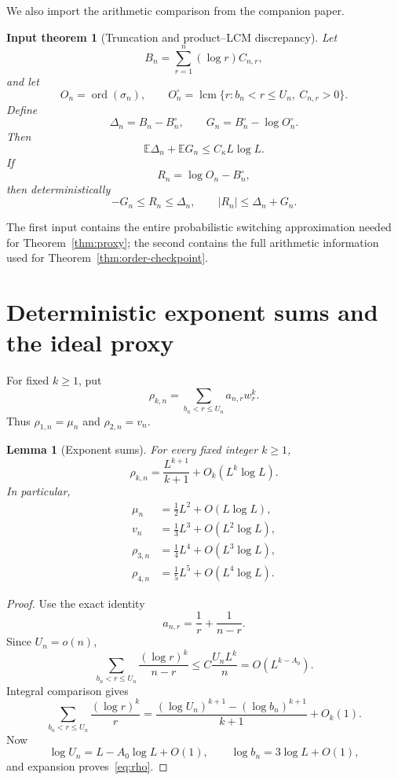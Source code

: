\documentclass[11pt]{article}
\newtheorem{lemma}[theorem]{Lemma}
\newtheorem{inputtheorem}[theorem]{Input theorem}
\theoremstyle{remark}
\newcommand{\Ee}{\mathbb E}
\newcommand{\ord}{\operatorname{ord}}
\newcommand{\lcm}{\operatorname{lcm}}
\begin{document}
We also import the arithmetic comparison from the companion paper.

\begin{inputtheorem}[Truncation and product--LCM discrepancy]
\label{input:arithmetic}
Let
\[
 B_n=\sum_{r=1}^n(\log r)C_{n,r},
\]
and let
\[
 O_n=\ord(\sigma_n),
 \qquad
 O_n^\circ=\lcm\{r:b_n<r\le U_n,\ C_{n,r}>0\}.
\]
Define
\[
 \Delta_n=B_n-B_n^\circ,
 \qquad
 G_n=B_n^\circ-\log O_n^\circ.
\]
Then
\begin{equation}
\label{eq:defect-means}
 \Ee\Delta_n+\Ee G_n\le C_\kappa L\log L.
\end{equation}
If
\[
 R_n=\log O_n-B_n^\circ,
\]
then deterministically
\begin{equation}
\label{eq:R-sandwich}
 -G_n\le R_n\le\Delta_n,
 \qquad
 |R_n|\le\Delta_n+G_n.
\end{equation}
\end{inputtheorem}

The first input contains the entire probabilistic switching approximation
needed for Theorem~\ref{thm:proxy}; the second contains the full arithmetic
information used for Theorem~\ref{thm:order-checkpoint}.

\section{Deterministic exponent sums and the ideal proxy}

For fixed $k\ge1$, put
\[
 \rho_{k,n}=\sum_{b_n<r\le U_n}a_{n,r}w_r^k.
\]
Thus $\rho_{1,n}=\mu_n$ and $\rho_{2,n}=v_n$.

\begin{lemma}[Exponent sums]
\label{lem:rho}
For every fixed integer $k\ge1$,
\begin{equation}
\label{eq:rho}
 \rho_{k,n}=\frac{L^{k+1}}{k+1}+O_k(L^k\log L).
\end{equation}
In particular,
\begin{align}
 \mu_n&=\frac12L^2+O(L\log L),\label{eq:mu-asymp}\\
 v_n&=\frac13L^3+O(L^2\log L),\label{eq:v-asymp}\\
 \rho_{3,n}&=\frac14L^4+O(L^3\log L),\label{eq:rho3}\\
 \rho_{4,n}&=\frac15L^5+O(L^4\log L).\label{eq:rho4}
\end{align}
\end{lemma}

\begin{proof}
Use the exact identity
\[
 a_{n,r}=\frac1r+\frac1{n-r}.
\]
Since $U_n=o(n)$,
\[
 \sum_{b_n<r\le U_n}\frac{(\log r)^k}{n-r}
 \le C\frac{U_nL^k}{n}
 =O(L^{k-A_0}).
\]
Integral comparison gives
\[
 \sum_{b_n<r\le U_n}\frac{(\log r)^k}{r}
 =\frac{(\log U_n)^{k+1}-(\log b_n)^{k+1}}{k+1}
 +O_k(1).
\]
Now
\[
 \log U_n=L-A_0\log L+O(1),
 \qquad
 \log b_n=3\log L+O(1),
\]
and expansion proves~\eqref{eq:rho}.
\end{proof}
\end{document}
